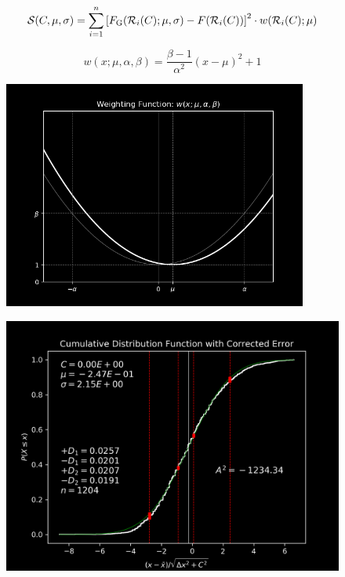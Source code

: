 \documentclass[9pt]{beamer}
\begin{document}
\begin{frame}
\[
\mathcal{S}(C, \mu, \sigma) = \sum_{i=1}^{n}
\bqty{F_\mathrm{G} (\mathcal{R}_i(C); \mu, \sigma)
  -F(\mathcal{R}_i(C))}^2
\cdot w(\mathcal{R}_i(C); \mu)
\]

\[
w(x;\mu, \alpha, \beta)
= \frac{\beta -1}{\alpha ^2}(x-\mu)^2 + 1
\]
\begin{figure}[h]
\centering
\includegraphics[width=10cm]{weight.png}
\end{figure}
\end{frame}

\begin{frame}
\begin{figure}[h]
\centering
\includegraphics[width=\textwidth]{gauss_ec}
\label{ref:gauss_ec}
\end{figure}
\end{frame}
\end{document}
